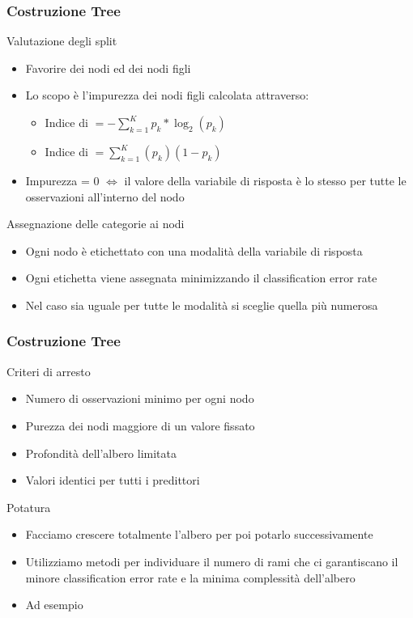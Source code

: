 	\begin{frame}
		\frametitle{Costruzione Tree}
		{\footnotesize
		\begin{block}{Valutazione degli split}
			\begin{itemize}
				\item Favorire  dei nodi ed  dei nodi figli
				\item Lo scopo è  l'impurezza dei nodi figli calcolata attraverso:
				\begin{itemize}
					\item Indice di  $= - \sum_{k=1}^{K} p_k * \log_2 (p_k)$
					\item Indice di  $= \sum_{k=1}^{K}(p_k)(1-p_k)$
				\end{itemize}
				\item Impurezza = 0 $\Leftrightarrow$ il valore della variabile di risposta è lo stesso per tutte le osservazioni all'interno del nodo
			\end{itemize}
		\end{block}
		\begin{block}{Assegnazione delle categorie ai nodi}
			\begin{itemize}
				\item Ogni nodo è etichettato con una modalità della variabile di risposta
				\item Ogni etichetta viene assegnata minimizzando il classification error rate
				\item Nel caso sia uguale per tutte le modalità si sceglie quella più numerosa
			\end{itemize}
		\end{block}}
	\end{frame}

	\begin{frame}
		\frametitle{Costruzione Tree}
		{\footnotesize
		\begin{block}{Criteri di arresto}
			\begin{itemize}
				\item Numero di osservazioni minimo per ogni nodo
				\item Purezza dei nodi maggiore di un valore fissato
				\item Profondità dell'albero limitata
				\item Valori identici per tutti i predittori
			\end{itemize}
		\end{block}
		\begin{block}{Potatura}
			\begin{itemize}
				\item Facciamo crescere totalmente l'albero per poi potarlo successivamente
				\item Utilizziamo metodi per individuare il numero di rami che ci garantiscano il minore classification error rate
				e la minima complessità dell'albero
				\item Ad esempio \torange{K-fold cross validation}
			\end{itemize}
		\end{block}}
	\end{frame}


